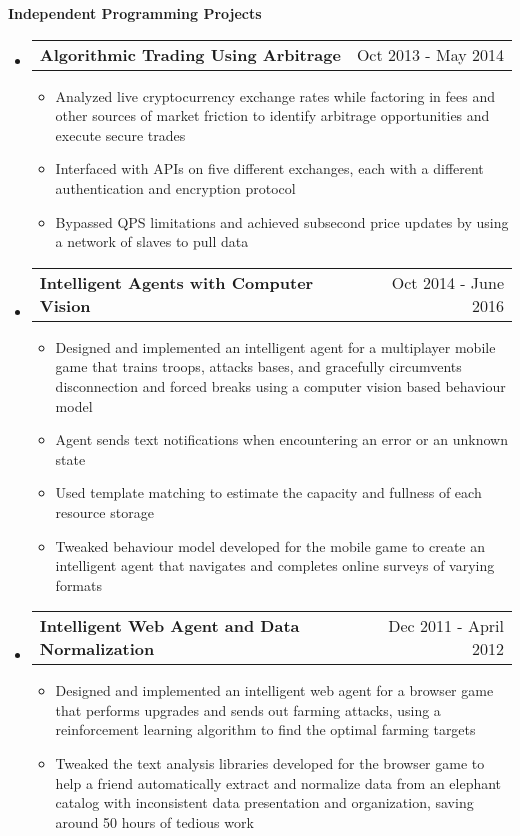 \documentclass[letterpaper,12pt]{article}
\makeatletter
\newcommand{\resitem}[1]{\item #1 \vspace{-2pt}}
\newcommand{\resheading}[1]{{\large \colorbox{mygrey}{\begin{minipage}{\textwidth}{\textbf{\sc #1 \vphantom{p\^{E}}}}\end{minipage}}}}
\newcommand{\miniheading}[2]{
	\begin{tabular*}{6.5in}{l@{\extracolsep{\fill}}r}
			\textbf{#1} & #2 \\
	\end{tabular*}\vspace{-6pt}
}
\makeatother
\begin{document}
\resheading{Independent Programming Projects}
    \begin{itemize}
        \item \miniheading{Algorithmic Trading Using Arbitrage}{Oct 2013 - May 2014}
            \begin{itemize}
                \resitem{Analyzed live cryptocurrency exchange rates while factoring in fees and other sources of market friction to identify arbitrage opportunities and execute secure trades}
                \resitem{Interfaced with APIs on five different exchanges, each with a different authentication and encryption protocol}
                \resitem{Bypassed QPS limitations and achieved subsecond price updates by using a network of slaves to pull data}
            \end{itemize}
        \item \miniheading{Intelligent Agents with Computer Vision}{Oct 2014 - June 2016}
            \begin{itemize}
                \resitem{Designed and implemented an intelligent agent for a multiplayer mobile game that trains troops, attacks bases, and gracefully circumvents disconnection and forced breaks using a computer vision based behaviour model}
                \resitem{Agent sends text notifications when encountering an error or an unknown state}
                \resitem{Used template matching to estimate the capacity and fullness of each resource storage}
                \resitem{Tweaked behaviour model developed for the mobile game to create an intelligent agent that navigates and completes online surveys of varying formats}
            \end{itemize}
        \item \miniheading{Intelligent Web Agent and Data Normalization}{Dec 2011 - April 2012}
            \begin{itemize}
                \resitem{Designed and implemented an intelligent web agent for a browser game that performs upgrades and sends out farming attacks, using a reinforcement learning algorithm to find the optimal farming targets}
                \resitem{Tweaked the text analysis libraries developed for the browser game to help a friend automatically extract and normalize data from an elephant catalog with inconsistent data presentation and organization, saving around 50 hours of tedious work}

\end{itemize}
\end{itemize}
\end{document}
